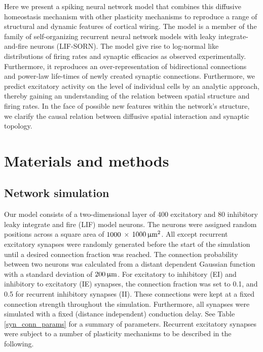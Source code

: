 \documentclass[10pt,letterpaper]{article}
\begin{document}
Here we present a spiking neural network model that combines this diffusive homeostasis mechanism with other plasticity mechanisms to reproduce a range of structural and dynamic features of cortical wiring. The model is a member of the family of self-organizing recurrent neural network models with leaky integrate-and-fire neurons (LIF-SORN). The model give rise to log-normal like distributions of firing rates and synaptic efficacies as observed experimentally. Furthermore, it reproduces an over-representation of bidirectional connections and power-law life-times of newly created synaptic connections. Furthermore, we predict excitatory activity on the level of individual cells by an analytic approach, thereby gaining an understanding of the relation between spatial structure and firing rates. In the face of possible new features within the network’s structure, we clarify the causal relation between diffusive spatial interaction and synaptic topology.


\section*{Materials and methods}
\subsection*{Network simulation} \label{network simulation}

Our model consists of a two-dimensional layer of 400 excitatory and 80 inhibitory  leaky integrate and fire (LIF) model neurons. The neurons were assigned random positions across a square area of $\rm 1000$ $\times$  $1000 \, \rm \upmu m^2$. All except recurrent excitatory synapses were randomly generated before the start of the simulation until a desired connection fraction was reached. The connection probability between two neurons was calculated from a distant dependent Gaussian function with a standard deviation of $\rm 200\, \upmu m$. For excitatory to inhibitory (EI) and inhibitory to excitatory (IE) synapses, the connection fraction was set to 0.1, and 0.5 for recurrent inhibitory synapses (II). These connections were kept at a fixed connection strength throughout the simulation. Furthermore, all synapses were simulated with a fixed (distance independent) conduction delay. See Table \ref{syn_conn_params} for a summary of parameters. Recurrent excitatory synapses were subject to a number of plasticity mechanisms to be described in the following. 
\end{document}
